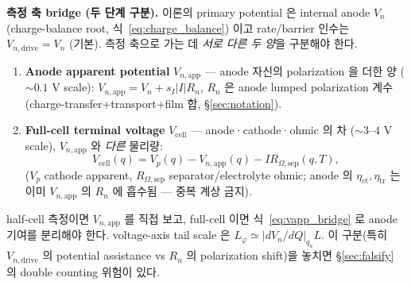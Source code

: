 \documentclass[11pt,a4paper]{article}
\newcommand{\app}{\mathrm{app}}
\newcommand{\dimedrive}{\mathrm{drive}}
\newcommand{\cell}{\mathrm{cell}}
\begin{document}
\textbf{측정 축 bridge (두 단계 구분).} 이론의 primary potential 은 internal anode
$V_n$ (charge-balance root, 식~\eqref{eq:charge_balance}) 이고 rate/barrier 인수는
$V_{n,\dimedrive}=V_n$ (기본). 측정 축으로 가는 데 \emph{서로 다른 두 양}을 구분해야 한다.
\begin{enumerate}[label=(\roman*)]
\item \textbf{Anode apparent potential} $V_{n,\app}$ — anode 자신의 polarization 을 더한
  양 ($\sim0.1$ V scale): $V_{n,\app}=V_n+s_I|I|R_n$, $R_n$ 은 anode lumped polarization
  계수 (charge-transfer+transport+film 합, \S\ref{sec:notation}).
\item \textbf{Full-cell terminal voltage} $V_{\cell}$ — anode·cathode·ohmic 의 차
  ($\sim3$--$4$ V scale), $V_{n,\app}$ 와 \emph{다른} 물리량:
  \begin{equation}
  V_{\cell}(q)=V_p(q)-V_{n,\app}(q)-I R_{\Omega,\mathrm{sep}}(q,T),
  \label{eq:vapp_bridge}
  \end{equation}
  ($V_p$ cathode apparent, $R_{\Omega,\mathrm{sep}}$ separator/electrolyte ohmic; anode
  의 $\eta_{\mathrm{ct}},\eta_{\mathrm{tr}}$ 는 이미 $V_{n,\app}$ 의 $R_n$ 에 흡수됨 —
  중복 계상 금지).
\end{enumerate}
half-cell 측정이면 $V_{n,\app}$ 를 직접 보고, full-cell 이면 식~\eqref{eq:vapp_bridge} 로
anode 기여를 분리해야 한다. voltage-axis tail scale 은 $L_\varphi\simeq|dV_n/dQ|_{q_a}L$.
이 구분(특히 $V_{n,\dimedrive}$ 의 potential assistance vs $R_n$ 의 polarization shift)을
놓치면 \S\ref{sec:falsify} 의 double counting 위험이 있다.

\end{document}
